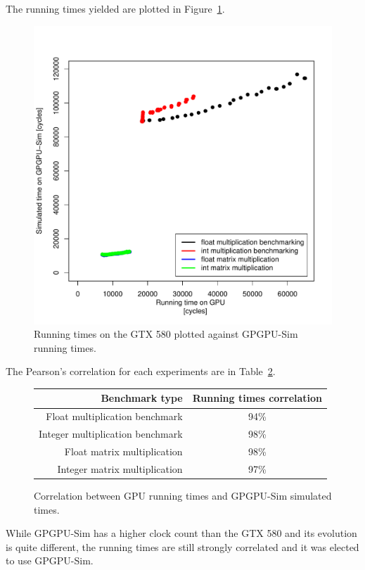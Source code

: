 \documentclass{report}
\begin{document}
    The running times yielded are plotted in Figure~\ref{fig:gpu-sim-corr}.
    \begin{figure}[H]
    \centering
        \includegraphics[width=0.9\linewidth]{graphics/comparative_graph}
        \captionsetup{justification=centering}
        \caption{Running times on the GTX 580 plotted against GPGPU-Sim running times.}
        \label{fig:gpu-sim-corr}
    \end{figure}

    The Pearson's correlation for each experiments are in Table~\ref{tab:gpu-sim-corr}.
    \begin{figure}[H]
    \centering
        \begin{tabular}{ | r | c | }
    	    \hline
    	    Benchmark type & Running times correlation \\ \hline
    	    Float multiplication benchmark & 94\% \\
            Integer multiplication benchmark & 98\% \\
            Float matrix multiplication & 98\% \\
            Integer matrix multiplication & 97\% \\ \hline
  	    \end{tabular}
  	\captionsetup{justification=centering}
  	\caption{Correlation between GPU running times and GPGPU-Sim simulated times.}
  	\label{tab:gpu-sim-corr}
    \end{figure}

    While GPGPU-Sim has a higher clock count than the GTX 580 and its evolution is quite different, the running times are still strongly correlated and it was elected to use GPGPU-Sim.

   
   {}
   
\end{document}
